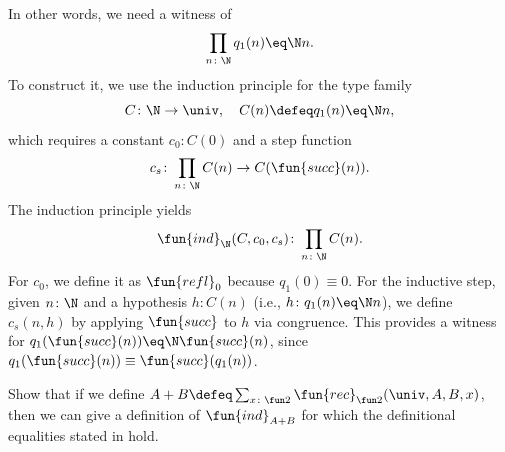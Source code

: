 \begin{solution}
    In other words, we need a witness of
    \[
        \prod_{n\colon\N} q_1(n) \eq\N n.
    \]
    To construct it, we use the induction principle  for the type family
    \[
        C\colon\N \to \univ, \quad C(n) \defeq q_1(n) \eq\N n,
    \]
    which requires a constant $c_0\colon C(0)$ and a step function 
    \[
        c_s\colon\prod_{n\colon\N}C(n)\to C(\fun{succ}(n)).
    \]
    The induction principle yields
    \[
        \fun{ind}_\N(C,c_0,c_s)\colon\prod_{n\colon\N}C(n).
    \]
    For $c_0$, we define it as $\fun{refl}_0$ because $q_1(0)\equiv 0$. For the inductive step, given $n\colon\N$ and a hypothesis $h\colon C(n)$ (i.e., $h\colon q_1(n)\eq\N n$), we define $c_s(n,h)$ by applying $\fun{succ}$ to $h$ via congruence. This provides a witness for $q_1(\fun{succ}(n))\eq\N\fun{succ}(n)$, since $q_1(\fun{succ}(n))\equiv\fun{succ}(q_1(n))$.
    
\end{solution}


\begin{exr}\label{exr:A+B-from-rec2}
    Show that if we define\/ $A+B\defeq\sum_{x\colon\fun2}\fun{rec}_{\fun2}(\univ,A,B,x)$, then we can give a definition of\/ $\fun{ind}_{A+B}$ for which the definitional equalities stated in {\upshape{}} hold.
\end{exr}


